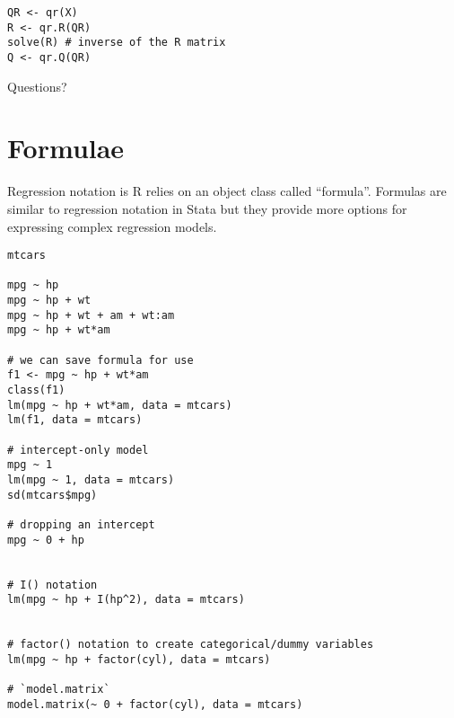 \documentclass[a4paper,12pt]{article}
\begin{document}
\begin{lstlisting}
QR <- qr(X)
R <- qr.R(QR)
solve(R) # inverse of the R matrix
Q <- qr.Q(QR)
\end{lstlisting}


Questions?



\section{Formulae}


Regression notation is R relies on an object class called ``formula''. Formulas are similar to regression notation in Stata but they provide more options for expressing complex regression models.

\begin{lstlisting}
mtcars

mpg ~ hp
mpg ~ hp + wt
mpg ~ hp + wt + am + wt:am
mpg ~ hp + wt*am

# we can save formula for use
f1 <- mpg ~ hp + wt*am
class(f1)
lm(mpg ~ hp + wt*am, data = mtcars)
lm(f1, data = mtcars)

# intercept-only model
mpg ~ 1
lm(mpg ~ 1, data = mtcars)
sd(mtcars$mpg)

# dropping an intercept
mpg ~ 0 + hp


# I() notation
lm(mpg ~ hp + I(hp^2), data = mtcars)


# factor() notation to create categorical/dummy variables
lm(mpg ~ hp + factor(cyl), data = mtcars)

# `model.matrix`
model.matrix(~ 0 + factor(cyl), data = mtcars)
\end{lstlisting}
\end{document}
